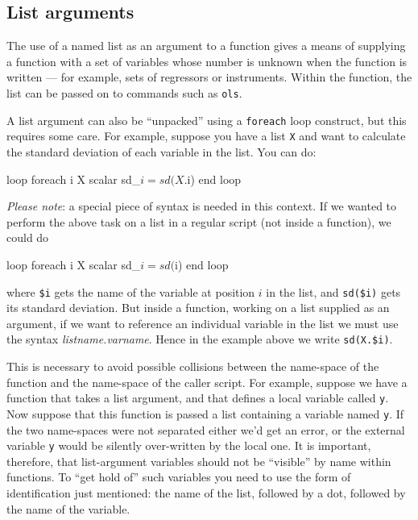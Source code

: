 \subsection{List arguments}

The use of a named list as an argument to a function gives a means of
supplying a function with a set of variables whose number is unknown
when the function is written --- for example, sets of regressors or
instruments.  Within the function, the list can be passed on to
commands such as \texttt{ols}.  

A list argument can also be ``unpacked'' using a \texttt{foreach} loop
construct, but this requires some care.  For example, suppose you have
a list \texttt{X} and want to calculate the standard deviation of each
variable in the list.  You can do:
%
\begin{code}
loop foreach i X
   scalar sd_$i = sd(X.$i)
end loop
\end{code}

\textit{Please note}: a special piece of syntax is needed in this
context.  If we wanted to perform the above task on a list in a
regular script (not inside a function), we could do
%
\begin{code}
loop foreach i X
   scalar sd_$i = sd($i)
end loop
\end{code}
%
where \verb|$i| gets the name of the variable at position $i$ in the
list, and \verb|sd($i)| gets its standard deviation.  But inside a
function, working on a list supplied as an argument, if we want to
reference an individual variable in the list we must use the syntax
\textsl{listname.varname}.  Hence in the example above we write
\verb|sd(X.$i)|.

This is necessary to avoid possible collisions between the name-space
of the function and the name-space of the caller script.  For example,
suppose we have a function that takes a list argument, and that
defines a local variable called \texttt{y}.  Now suppose that this
function is passed a list containing a variable named \texttt{y}.  If
the two name-spaces were not separated either we'd get an error, or
the external variable \texttt{y} would be silently over-written by the
local one.  It is important, therefore, that list-argument variables
should not be ``visible'' by name within functions.  To ``get hold
of'' such variables you need to use the form of identification just
mentioned: the name of the list, followed by a dot, followed by the
name of the variable.


